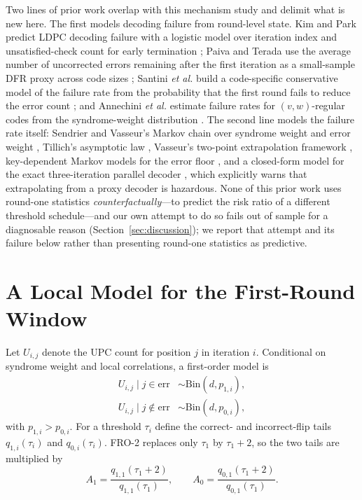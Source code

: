 \documentclass[lettersize,journal]{IEEEtran}
\begin{document}
Two lines of prior work overlap with this mechanism study and delimit what is new here. The first models decoding failure from round-level state. Kim and Park predict LDPC decoding failure with a logistic model over iteration index and unsatisfied-check count for early termination \cite{kim2021logistic}; Paiva and Terada use the average number of uncorrected errors remaining after the first iteration as a small-sample DFR proxy across code sizes \cite{paiva2022pickyfix}; Santini \emph{et al.} build a code-specific conservative model of the failure rate from the probability that the first round fails to reduce the error count \cite{santini2019conservative}; and Annechini \emph{et al.} estimate failure rates for $(v,w)$-regular codes from the syndrome-weight distribution \cite{annechini2024estimation}. The second line models the failure rate itself: Sendrier and Vasseur's Markov chain over syndrome weight and error weight \cite{sendrier2019dfr}, Tillich's asymptotic law \cite{tillich2018dfp}, Vasseur's two-point extrapolation framework \cite{vasseur2021thesis}, key-dependent Markov models for the error floor \cite{arpin2025errorfloor}, and a closed-form model for the exact three-iteration parallel decoder \cite{annechini2025closedform}, which explicitly warns that extrapolating from a proxy decoder is hazardous. None of this prior work uses round-one statistics \emph{counterfactually}---to predict the risk ratio of a different threshold schedule---and our own attempt to do so fails out of sample for a diagnosable reason (Section~\ref{sec:discussion}); we report that attempt and its failure below rather than presenting round-one statistics as predictive.

\section{A Local Model for the First-Round Window}\label{sec:model}

Let $U_{i,j}$ denote the UPC count for position $j$ in iteration $i$. Conditional on syndrome weight and local correlations, a first-order model is
\begin{equation}
\begin{aligned}
U_{i,j}\mid j\in\mathrm{err} &\sim \mathrm{Bin}(d,p_{1,i}),\\
U_{i,j}\mid j\notin\mathrm{err} &\sim \mathrm{Bin}(d,p_{0,i}),
\end{aligned}
\end{equation}
with $p_{1,i}>p_{0,i}$. For a threshold $\tau_i$ define the correct- and incorrect-flip tails $q_{1,i}(\tau_i)$ and $q_{0,i}(\tau_i)$. FRO-2 replaces only $\tau_1$ by $\tau_1+2$, so the two tails are multiplied by
\begin{equation}
A_1=\frac{q_{1,1}(\tau_1+2)}{q_{1,1}(\tau_1)},\qquad
A_0=\frac{q_{0,1}(\tau_1+2)}{q_{0,1}(\tau_1)} .
\end{equation}
\end{document}
